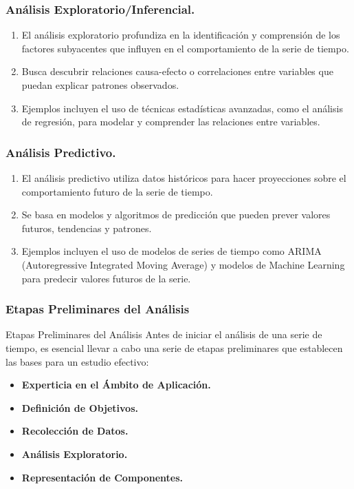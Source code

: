 \documentclass{beamer}
\begin{document}
\begin{frame}
	\frametitle{Análisis Exploratorio/Inferencial.}
	\begin{enumerate}
		\item El análisis exploratorio profundiza en la identificación y comprensión de los factores subyacentes que influyen en el comportamiento de la serie de tiempo.
		\item Busca descubrir relaciones causa-efecto o correlaciones entre variables que puedan explicar patrones observados.
		\item Ejemplos incluyen el uso de técnicas estadísticas avanzadas, como el análisis de regresión, para modelar y comprender las relaciones entre variables.
	\end{enumerate}
\end{frame}

\begin{frame}
	\frametitle{Análisis Predictivo.}
	\begin{enumerate}
		\item El análisis predictivo utiliza datos históricos para hacer proyecciones sobre el comportamiento futuro de la serie de tiempo.
		\item Se basa en modelos y algoritmos de predicción que pueden prever valores futuros, tendencias y patrones.
		\item Ejemplos incluyen el uso de modelos de series de tiempo como ARIMA (Autoregressive Integrated Moving Average) y modelos de Machine Learning para predecir valores futuros de la serie.
	\end{enumerate}
\end{frame}

\begin{frame}
	\frametitle{Etapas Preliminares del Análisis}
	\begin{block}{Etapas Preliminares del Análisis}
		Antes de iniciar el análisis de una serie de tiempo, es esencial llevar a cabo una serie de etapas preliminares que establecen las bases para un estudio efectivo:
		\begin{itemize}
			\item \textbf{Experticia en el Ámbito de Aplicación.} 
			\item \textbf{Definición de Objetivos.}
			\item \textbf{Recolección de Datos.}
			\item \textbf{Análisis Exploratorio.} 
			\item \textbf{Representación de Componentes.}
		\end{itemize}
	\end{block}
  \end{frame}
\end{document}
